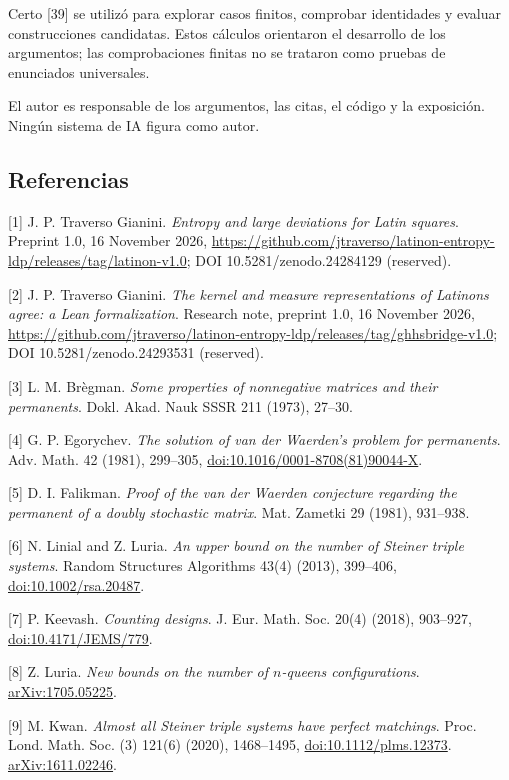 \documentclass[spanish,11pt,a4paper]{article}
\begin{document}
Certo {[}39{]} se utilizó para explorar casos finitos, comprobar identidades y evaluar construcciones candidatas. Estos cálculos orientaron el desarrollo de los argumentos; las comprobaciones finitas no se trataron como pruebas de enunciados universales.

El autor es responsable de los argumentos, las citas, el código y la exposición. Ningún sistema de IA figura como autor.

\subsection{Referencias}\label{referencias}
\begingroup\small\sloppy

{[}1{]} J. P. Traverso Gianini. \emph{Entropy and large deviations for Latin squares}. Preprint 1.0, 16 November 2026, \url{https://github.com/jtraverso/latinon-entropy-ldp/releases/tag/latinon-v1.0}; DOI 10.5281/zenodo.24284129 (reserved).

{[}2{]} J. P. Traverso Gianini. \emph{The kernel and measure representations of Latinons agree: a Lean formalization}. Research note, preprint 1.0, 16 November 2026, \url{https://github.com/jtraverso/latinon-entropy-ldp/releases/tag/ghhsbridge-v1.0}; DOI 10.5281/zenodo.24293531 (reserved).

{[}3{]} L. M. Brègman. \emph{Some properties of nonnegative matrices and their permanents}. Dokl. Akad. Nauk SSSR 211 (1973), 27--30.

{[}4{]} G. P. Egorychev. \emph{The solution of van der Waerden's problem for permanents}. Adv. Math. 42 (1981), 299--305, \href{https://doi.org/10.1016/0001-8708(81)90044-X}{doi:10.1016/0001-8708(81)90044-X}.

{[}5{]} D. I. Falikman. \emph{Proof of the van der Waerden conjecture regarding the permanent of a doubly stochastic matrix}. Mat. Zametki 29 (1981), 931--938.

{[}6{]} N. Linial and Z. Luria. \emph{An upper bound on the number of Steiner triple systems}. Random Structures Algorithms 43(4) (2013), 399--406, \href{https://doi.org/10.1002/rsa.20487}{doi:10.1002/rsa.20487}.

{[}7{]} P. Keevash. \emph{Counting designs}. J. Eur. Math. Soc. 20(4) (2018), 903--927, \href{https://doi.org/10.4171/JEMS/779}{doi:10.4171/JEMS/779}.

{[}8{]} Z. Luria. \emph{New bounds on the number of \(n\)-queens configurations}. \href{https://arxiv.org/abs/1705.05225}{arXiv:1705.05225}.

{[}9{]} M. Kwan. \emph{Almost all Steiner triple systems have perfect matchings}. Proc. Lond. Math. Soc. (3) 121(6) (2020), 1468--1495, \href{https://doi.org/10.1112/plms.12373}{doi:10.1112/plms.12373}. \href{https://arxiv.org/abs/1611.02246}{arXiv:1611.02246}.
\end{document}
